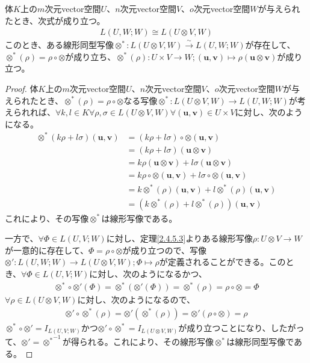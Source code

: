 \documentclass[dvipdfmx]{jsarticle}
\begin{document}
\begin{thm}\label{2.4.5.18}
体$K$上の$m$次元vector空間$U$、$n$次元vector空間$V$、$o$次元vector空間$W$が与えられたとき、次式が成り立つ。
\begin{align*}
L(U,W;W) \cong L(U \otimes V,W)
\end{align*}
このとき、ある線形同型写像$\otimes^{*}:L(U \otimes V,W)\overset{\sim}{\rightarrow}L(U,W;W)$が存在して、$\otimes^{*}(\rho) = \rho \circ \otimes$が成り立ち、$\otimes^{*}(\rho):U \times V \rightarrow W;\left( \mathbf{u},\mathbf{v} \right) \mapsto \rho\left( \mathbf{u} \otimes \mathbf{v} \right)$が成り立つ。
\end{thm}
\begin{proof}
体$K$上の$m$次元vector空間$U$、$n$次元vector空間$V$、$o$次元vector空間$W$が与えられたとき、$\otimes^{*}(\rho) = \rho \circ \otimes$なる写像$\otimes^{*}:L(U \otimes V,W) \rightarrow L(U,W;W)$が考えられれば、$\forall k,l \in K\forall\rho,\sigma \in L(U \otimes V,W)\forall\left( \mathbf{u},\mathbf{v} \right) \in U \times V$に対し、次のようになる。
\begin{align*}
\otimes^{*}(k\rho + l\sigma)\left( \mathbf{u},\mathbf{v} \right) &= (k\rho + l\sigma) \circ \otimes \left( \mathbf{u},\mathbf{v} \right)\\
&= (k\rho + l\sigma)\left( \mathbf{u} \otimes \mathbf{v} \right)\\
&= k\rho\left( \mathbf{u} \otimes \mathbf{v} \right) + l\sigma\left( \mathbf{u} \otimes \mathbf{v} \right)\\
&= k\rho \circ \otimes \left( \mathbf{u},\mathbf{v} \right) + l\sigma \circ \otimes \left( \mathbf{u},\mathbf{v} \right)\\
&= k \otimes^{*}(\rho)\left( \mathbf{u},\mathbf{v} \right) + l \otimes^{*}(\rho)\left( \mathbf{u},\mathbf{v} \right)\\
&= \left( k \otimes^{*}(\rho) + l \otimes^{*}(\rho) \right)\left( \mathbf{u},\mathbf{v} \right)
\end{align*}
これにより、その写像$\otimes^{*}$は線形写像である。\par
一方で、$\forall\varPhi \in L(U,V;W)$に対し、定理\ref{2.4.5.3}よりある線形写像$\rho:U \otimes V \rightarrow W$が一意的に存在して、$\varPhi = \rho \circ \otimes$が成り立つので、写像$\otimes':L(U,W;W) \rightarrow L(U \otimes V,W);\varPhi \mapsto \rho$が定義されることができる。このとき、$\forall\varPhi \in L(U,V;W)$に対し、次のようになるかつ、
\begin{align*}
\otimes^{*} \circ \otimes'(\varPhi) = \otimes^{*}\left( \otimes'(\varPhi) \right) = \otimes^{*}(\rho) = \rho \circ \otimes = \varPhi
\end{align*}
$\forall\rho \in L(U \otimes V,W)$に対し、次のようになるので、
\begin{align*}
\otimes' \circ \otimes^{*}(\rho) = \otimes'\left( \otimes^{*}(\rho) \right) = \otimes'(\rho \circ \otimes ) = \rho
\end{align*}
$\otimes^{*} \circ \otimes' = I_{L(U,V;W)}$かつ$\otimes' \circ \otimes^{*} = I_{L(U \otimes V,W)}$が成り立つことになり、したがって、$\otimes' = {\otimes^{*}}^{- 1}$が得られる。これにより、その線形写像$\otimes^{*}$は線形同型写像である。
\end{proof}
\end{document}
